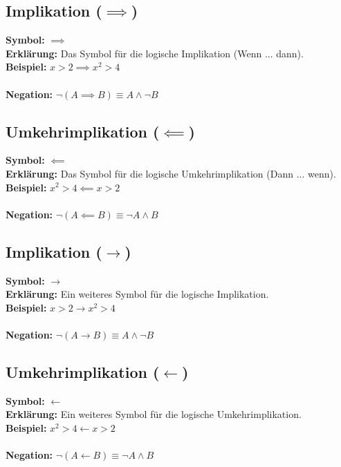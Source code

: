 \documentclass[12pt,a4paper]{article}
\begin{document}
\subsection{Implikation (\texorpdfstring{$\implies$}{implies})}
\textbf{Symbol:} $\implies$ \\
\textbf{Erklärung:} Das Symbol für die logische Implikation (Wenn ... dann). \\
\textbf{Beispiel:} $x > 2 \implies x^2 > 4$ \\ \\
\textbf{Negation:} $\neg (A \implies B) \equiv A \land \neg B$

\subsection{Umkehrimplikation (\texorpdfstring{$\impliedby$}{impliedby})}
\textbf{Symbol:} $\impliedby$ \\
\textbf{Erklärung:} Das Symbol für die logische Umkehrimplikation (Dann ... wenn). \\
\textbf{Beispiel:} $x^2 > 4 \impliedby x > 2$ \\ \\
\textbf{Negation:} $\neg (A \impliedby B) \equiv \neg A \land B$

\subsection{Implikation (\texorpdfstring{$\rightarrow$}{rightarrow})}
\textbf{Symbol:} $\rightarrow$ \\
\textbf{Erklärung:} Ein weiteres Symbol für die logische Implikation. \\
\textbf{Beispiel:} $x > 2 \rightarrow x^2 > 4$ \\ \\
\textbf{Negation:} $\neg (A \rightarrow B) \equiv A \land \neg B$

\subsection{Umkehrimplikation (\texorpdfstring{$\leftarrow$}{leftarrow})}
\textbf{Symbol:} $\leftarrow$ \\
\textbf{Erklärung:} Ein weiteres Symbol für die logische Umkehrimplikation. \\
\textbf{Beispiel:} $x^2 > 4 \leftarrow x > 2$ \\ \\
\textbf{Negation:} $\neg (A \leftarrow B) \equiv \neg A \land B$
\end{document}
